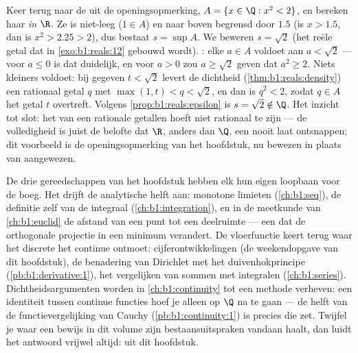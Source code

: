\begin{example}\label{ex:b1:reals:supescape}
Keer terug naar de  uit de openingsopmerking, $A = \{x \in \Q
: x^2 < 2\}$, en bereken haar  \emph{in $\R$}. Ze is niet-leeg
($1 \in A$) en naar boven begrensd door $1.5$ (is $x > 1.5$, dan is $x^2
> 2.25 > 2$), dus bestaat $s = \sup A$. We beweren $s = \sqrt 2$ (het
reële getal dat in \cref{exo:b1:reals:12} gebouwd wordt). :
elke $a \in A$ voldoet aan $a < \sqrt2$ --- voor $a \leq 0$ is dat
duidelijk, en voor $a > 0$ zou $a \geq \sqrt2$ geven dat $a^2 \geq 2$.
Niets kleiners voldoet: bij gegeven $t < \sqrt2$ levert de dichtheid
(\cref{thm:b1:reals:density}) een rationaal getal $q$ met $\max(1, t) < q
< \sqrt 2$, en dan is $q^2 < 2$, zodat $q \in A$ het getal $t$
overtreft. Volgens \cref{prop:b1:reals:epsilon} is $s = \sqrt2 \notin
\Q$. Het inzicht tot slot: het  van een  rationale
getallen hoeft niet rationaal te zijn --- de volledigheid is juist de
belofte dat $\R$, anders dan $\Q$, een  nooit laat ontsnappen;
dit voorbeeld is de openingsopmerking van het hoofdstuk, nu bewezen in
plaats van aangewezen.
\end{example}

\begin{remark}
De drie gereedschappen van het hoofdstuk hebben elk hun eigen loopbaan
voor de boeg. Het  drijft de analytische helft aan: monotone
limieten (\cref{ch:b1:seq}), de definitie zelf van de integraal
(\cref{ch:b1:integration}), en in de meetkunde van \cref{ch:b1:euclid} de
afstand van een punt tot een deelruimte --- een  dat de
orthogonale projectie in een minimum verandert. De vloerfunctie keert
terug waar het discrete het continue ontmoet: cijferontwikkelingen (de
weekendopgave van dit hoofdstuk), de benadering van Dirichlet met het
duivenhokprincipe (\cref{pb:b1:derivative:1}), het vergelijken van sommen
met integralen (\cref{ch:b1:series}). Dichtheidsargumenten worden in
\cref{ch:b1:continuity} tot een methode verheven: een identiteit tussen
continue functies hoef je alleen op $\Q$ na te gaan --- de helft van de
functievergelijking van Cauchy (\cref{pb:b1:continuity:1}) is precies die
zet. Twijfel je waar een bewijs in dit volume zijn bestaansuitspraken
vandaan haalt, dan luidt het antwoord vrijwel altijd: uit dit hoofdstuk.
\end{remark}

